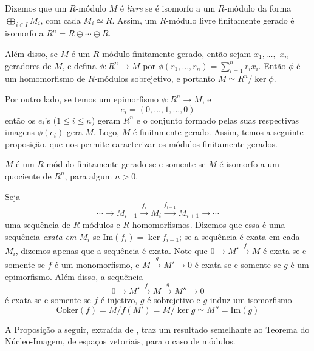 Dizemos que um $R$-módulo $M$ é \emph{livre} se é isomorfo a um $R$-módulo da forma $\bigoplus_{i \in I}M_i$, com cada $M_i \simeq R$. Assim, um $R$-módulo livre finitamente gerado é isomorfo a $R^n = R\oplus \cdots \oplus R$. \par
Além disso, se $M$ é um $R$-módulo finitamente gerado, então sejam $x_1,\dots,$ $x_n$ geradores de $M$, e defina $\phi: R^n\rightarrow M$ por $\phi(r_1,\dots,r_n)=\sum_{i=1}^{n}r_i x_i$. Então $\phi$ é um homomorfismo de $R$-módulos sobrejetivo, e portanto $M\simeq R^n/\ker \phi $. \par
Por outro lado, se temos um epimorfismo $\phi: R^n \rightarrow M$, e \[e_i = (0,\dots,1,\dots,0)\] então os $e_i$'s ($1\leq i \leq n$) geram $R^n$ e o conjunto formado pelas suas respectivas imagens $\phi(e_i)$ gera $M$. Logo, $M$ é finitamente gerado. Assim, temos a seguinte proposição, que nos permite caracterizar os módulos finitamente gerados.
\begin{prop}\cite[II,Propositon 2.3]{atiyah}
$M$ é um $R$-módulo finitamente gerado se e somente se $M$ é isomorfo a um quociente de $R^n$, para algum $n>0$.
\end{prop}
Seja \[\cdots \rightarrow M_{i-1}\xrightarrow{f_i}M_i \xrightarrow{f_{i+1}}M_{i+1}\rightarrow \cdots\] uma sequência de $R$-módulos e $R$-homomorfismos. Dizemos que essa é uma sequência \emph{exata em $M_i$} se $\textrm{Im}(f_i) = \ker f_{i+1} $; se a sequência é exata em cada $M_i$, dizemos apenas que a sequência é exata. Note que $0 \rightarrow M' \xrightarrow{f} M$ é exata se e somente se $f$ é um monomorfismo, e $M \xrightarrow{g} M' \rightarrow 0$ é exata se e somente se $g$ é um epimorfismo. Além disso, a sequência \[0 \rightarrow M' \xrightarrow{f} M \xrightarrow{g} M'' \rightarrow 0\] é exata se e somente se $f$ é injetivo, $g$ é sobrejetivo e $g$ induz um isomorfismo \[\textrm{Coker}(f)=M/f(M')= M/\ker g \simeq M'' = \textrm{Im}(g)\] \par
A Proposição a seguir, extraída de \cite[1.3.6]{alveri}, traz um resultado semelhante ao Teorema do Núcleo-Imagem, de espaços vetoriais, para o caso de módulos.
